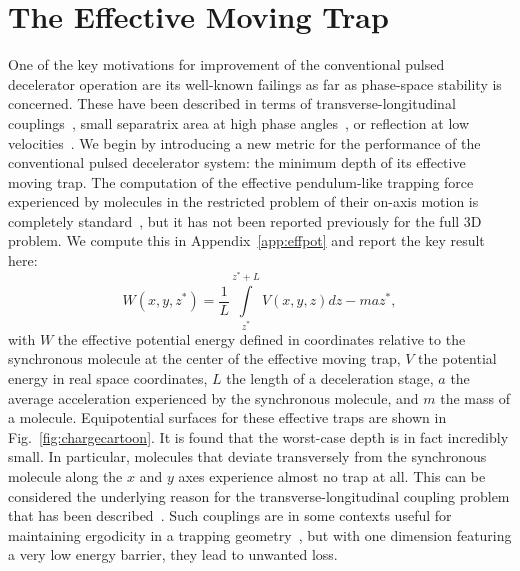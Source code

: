 \documentclass[%
 reprint,
 amsmath,amssymb,
 aps,
pra,
]{revtex4-1}
\begin{document}
\section{The Effective Moving Trap}
One of the key motivations for improvement of the conventional pulsed decelerator operation are its well-known failings as far as phase-space stability is concerned. These have been described in terms of transverse-longitudinal couplings~\cite{VanDeMeerakker2006}, small separatrix area at high phase angles~\cite{Hudson2004}, or reflection at low velocities~\cite{Sawyer2008a}. We begin by introducing a new metric for the performance of the conventional pulsed decelerator system: the minimum depth of its effective moving trap. The computation of the effective pendulum-like trapping force experienced by molecules in the restricted problem of their on-axis motion is completely standard~\cite{Bethlem2000,Hudson2004}, but it has not been reported previously for the full 3D problem. We compute this in Appendix~\ref{app:effpot} and report the key result here:
\begin{equation}
W(x,y,z^*) =\frac{1}{L}\int\limits_{z^*}^{z^*+L}V(x,y,z) dz - maz^*,
\end{equation}
with $W$ the effective potential energy defined in coordinates relative to the synchronous molecule at the center of the effective moving trap, $V$ the potential energy in real space coordinates, $L$ the length of a deceleration stage, $a$ the average acceleration experienced by the synchronous molecule, and $m$ the mass of a molecule.
Equipotential surfaces for these effective traps are shown in Fig.~\ref{fig:chargecartoon}. It is found that the worst-case depth is in fact incredibly small. In particular, molecules that deviate transversely from the synchronous molecule along the $x$ and $y$ axes experience almost no trap at all. This can be considered the underlying reason for the transverse-longitudinal coupling problem that has been described~\cite{VanDeMeerakker2006}. Such couplings are in some contexts useful for maintaining ergodicity in a trapping geometry~\cite{Surkov1996}, but with one dimension featuring a very low energy barrier, they lead to unwanted loss.
\end{document}
